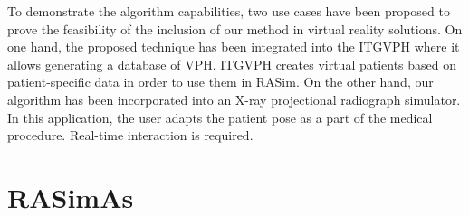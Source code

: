 To demonstrate the algorithm capabilities, two use cases have been proposed to prove the feasibility of the inclusion of our method in virtual reality solutions.
%
On one hand, the proposed technique has been integrated into the \acs{ITGVPH} where it allows generating a database of VPH. %
\acs{ITGVPH} creates virtual patients based on patient-specific data in order to use them in \acs{RASim}.
%
On the other hand, our algorithm has been incorporated into an X-ray projectional radiograph simulator. In this application, the user adapts the patient pose as a part of the medical procedure. Real-time interaction is required. %


 

\section{RASimAs}


